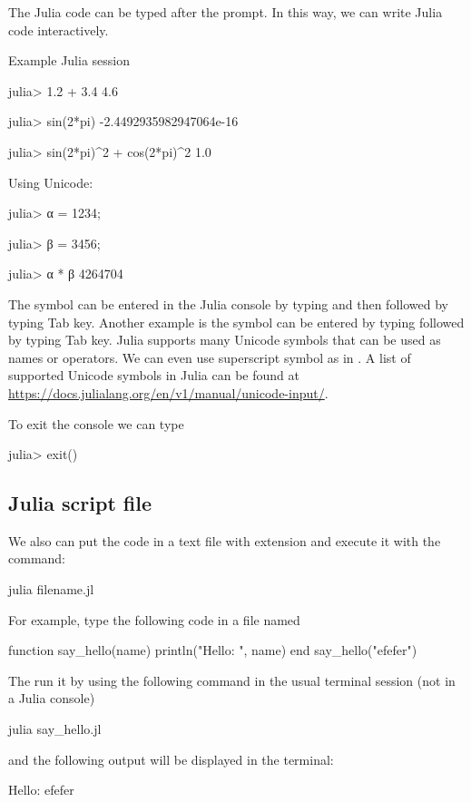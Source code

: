 The Julia code can be typed after the  prompt. In this way,
we can write Julia code interactively.

Example Julia session
\begin{textcode}
julia> 1.2 + 3.4
4.6

julia> sin(2*pi)
-2.4492935982947064e-16

julia> sin(2*pi)^2 + cos(2*pi)^2
1.0
\end{textcode}

Using Unicode:
\begin{textcode}
julia> α = 1234;

julia> β = 3456;

julia> α * β
4264704
\end{textcode}

The symbol  can be entered in the Julia console by typing \txtinline{\alpha} and
then followed by typing Tab key.
Another example is the  symbol can be entered by typing \txtinline{\nabla} followed
by typing Tab key.
Julia supports many Unicode symbols that can be used
as names or operators.
We can even use superscript symbol as in .
A list of supported Unicode symbols in Julia can be found at
{\footnotesize\url{https://docs.julialang.org/en/v1/manual/unicode-input/}}.

To exit the console we can type
\begin{textcode}
julia> exit()
\end{textcode}


\subsection{Julia script file}

We also can put the code in a text file with  extension and
execute it with the command:
%
\begin{bashcode}
julia filename.jl
\end{bashcode}

For example, type the following code in a file named 
\begin{juliacode}
function say_hello(name)
    println("Hello: ", name)
end
say_hello("efefer")
\end{juliacode}
The run it by using the following command in the usual terminal session
(not in a Julia console)
\begin{textcode}
julia say_hello.jl
\end{textcode}
and the following output will be displayed in the terminal:
\begin{textcode}
Hello: efefer
\end{textcode}




